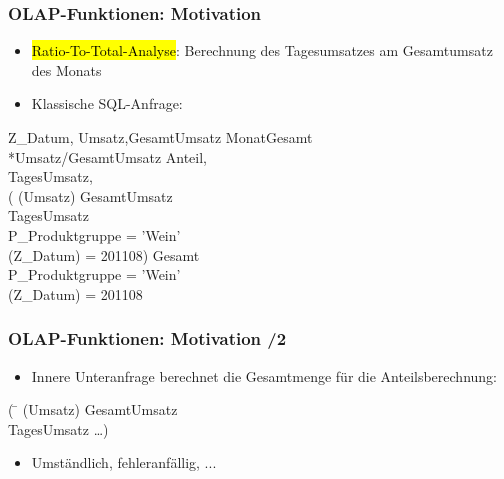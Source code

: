     \begin{frame}
    \frametitle{OLAP-Funktionen: Motivation}
    
    \begin{itemize}
    \item \hl{Ratio-To-Total-Analyse}: Berechnung des Tagesumsatzes am Gesamtumsatz des Monats
      \item Klassische SQL-Anfrage:
    \end{itemize}
    
    \begin{sql}
     Z\_Datum, Umsatz,GesamtUmsatz  MonatGesamt \\
    *Umsatz/GesamtUmsatz  Anteil, \\
      TagesUmsatz, \\
    \1 ( (Umsatz)  GesamtUmsatz \\
    \1  TagesUmsatz \\
    \1  P\_Produktgruppe = 'Wein'  \\
    \2 (Z\_Datum) = 201108)  Gesamt \\
      P\_Produktgruppe = 'Wein'  \\
    \1 (Z\_Datum) = 201108
      \end{sql}
    
    \end{frame}
    
    \begin{frame}
      \frametitle{OLAP-Funktionen: Motivation /2}
    
      \begin{itemize}
      \item Innere Unteranfrage berechnet die Gesamtmenge für die
        Anteilsberechnung:
      \end{itemize}
    
      \begin{sql}
          ( \=  (Umsatz)  GesamtUmsatz \\
        \1  TagesUmsatz  \dots )
        \end{sql}
    
        \begin{itemize}
        \item Umständlich, fehleranfällig, ...
        \end{itemize}
    
    \end{frame}
    
